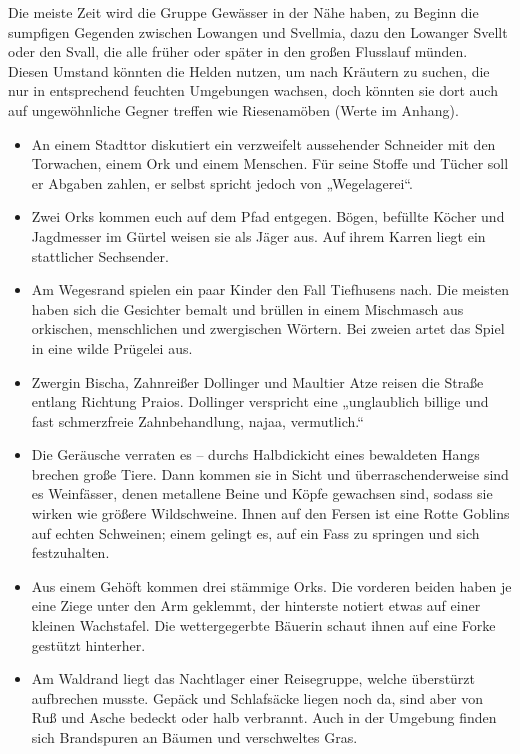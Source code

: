 Die meiste Zeit wird die Gruppe Gewässer in der Nähe haben, zu Beginn die sumpfigen Gegenden zwischen Lowangen und Svellmia, dazu den Lowanger Svellt oder den Svall, die alle früher oder später in den großen Flusslauf münden. Diesen Umstand könnten die Helden nutzen, um nach Kräutern zu suchen, die nur in entsprechend feuchten Umgebungen wachsen, doch könnten sie dort auch auf ungewöhnliche Gegner treffen wie Riesenamöben (Werte im Anhang).

\begin{itemize}
\item An einem Stadttor diskutiert ein verzweifelt aussehender Schneider mit den Torwachen, einem Ork und einem Menschen. Für seine Stoffe und Tücher soll er Abgaben zahlen, er selbst spricht jedoch von „Wegelagerei“.

\item Zwei Orks kommen euch auf dem Pfad entgegen. Bögen, befüllte Köcher und Jagdmesser im Gürtel weisen sie als Jäger aus. Auf ihrem Karren liegt ein stattlicher Sechsender.

\item Am Wegesrand spielen ein paar Kinder den Fall Tiefhusens nach. Die meisten haben sich die Gesichter bemalt und brüllen in einem Mischmasch aus orkischen, menschlichen und zwergischen Wörtern. Bei zweien artet das Spiel in eine wilde Prügelei aus.

\item Zwergin Bischa, Zahnreißer Dollinger und Maultier Atze reisen die Straße entlang Richtung Praios. Dollinger verspricht eine „unglaublich billige und fast schmerzfreie Zahnbehandlung, najaa, vermutlich.“

\item Die Geräusche verraten es -- durchs Halbdickicht eines bewaldeten Hangs brechen große Tiere.
Dann kommen sie in Sicht und überraschenderweise sind es Weinfässer, denen metallene Beine und Köpfe gewachsen sind, sodass sie wirken wie größere Wildschweine.
Ihnen auf den Fersen ist eine Rotte Goblins auf echten Schweinen; einem gelingt es, auf ein Fass zu springen und sich festzuhalten.

\item Aus einem Gehöft kommen drei stämmige Orks.
Die vorderen beiden haben je eine Ziege unter den Arm geklemmt, der hinterste notiert etwas auf einer kleinen Wachstafel.
Die wettergegerbte Bäuerin schaut ihnen auf eine Forke gestützt hinterher.

\item Am Waldrand liegt das Nachtlager einer Reisegruppe, welche überstürzt aufbrechen musste.
Gepäck und Schlafsäcke liegen noch da, sind aber von Ruß und Asche bedeckt oder halb verbrannt.
Auch in der Umgebung finden sich Brandspuren an Bäumen und verschweltes Gras. 
\end{itemize}

